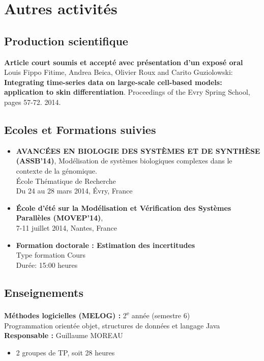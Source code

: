 \chapter{Autres activités}

\section{Production scientifique}

\textbf{Article court soumis et accepté avec présentation d'un exposé oral}\\
Louis Fippo Fitime, Andrea Beica, Olivier Roux and Carito Guziolowski:
\textbf{Integrating time-series data on large-scale cell-based models: application to skin differentiation}.
Proceedings of the Evry Spring School, pages 57-72. 2014.

\section{Ecoles et Formations suivies}

\begin{itemize}
\item \textbf{AVANCÉES EN BIOLOGIE DES SYSTÈMES ET DE SYNTHÈSE (ASSB'14)},
Modélisation de systèmes biologiques complexes dans le contexte de la génomique.\\
École Thématique de Recherche\\
Du 24 au 28 mars 2014, Évry, France 

\item \textbf{École d'été sur la Modélisation et Vérification des Systèmes Parallèles (MOVEP'14)},\\
7-11 juillet 2014, Nantes, France 

\item \textbf{Formation doctorale : Estimation des incertitudes}\\
Type formation Cours \\
Durée: 15:00 heures
\end{itemize}

\section{Enseignements}


\noindent
\textbf{Méthodes logicielles (MELOG) :} 2\textsuperscript{e} année (semestre 6)\\
Programmation orientée objet, structures de données et langage Java\\
\textbf{Responsable :} Guillaume MOREAU
\begin{itemize}
  \item 2 groupes de TP, soit 28 heures
\end{itemize}

